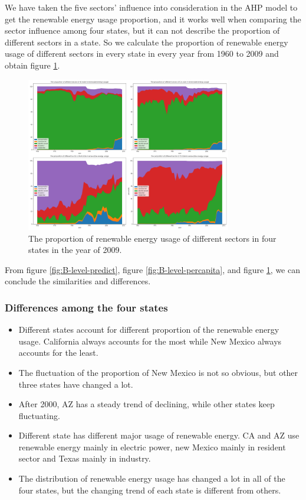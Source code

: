\documentclass[a4paper,11pt]{article}
\begin{document}
\par We have taken the five sectors' influence into consideration in the AHP model to get the renewable energy usage proportion, and it works well when comparing the sector influence among four states, but it can not describe the proportion of different sectors in a state. So we calculate the proportion of renewable energy usage of different sectors in every state in every year from 1960 to 2009 and obtain figure \ref{fig:B-percent}.
\begin{figure}[h]%
    \centering 
    \includegraphics[width=0.8\textwidth]{./Pic/B-percent.png}
    \caption{The proportion of renewable energy usage of different sectors in four states in the year of 2009.}
    \label{fig:B-percent}  
\end{figure}
\par From figure \ref{fig:B-level-predict}, figure \ref{fig:B-level-percapita}, and figure \ref{fig:B-percent}, we can conclude the similarities and differences.


\subsubsection{Differences among the four states}

\begin{itemize}
    \item Different states account for different proportion of the renewable energy usage. California always accounts for the most while New Mexico always accounts for the least.
    \item The fluctuation of the proportion of New Mexico is not so obvious, but other three states have changed a lot.
    \item After 2000, AZ has a steady trend of declining, while other states keep fluctuating.
    \item Different state has different major usage of renewable energy. CA and AZ use renewable energy mainly in electric power, new Mexico mainly in resident sector and Texas mainly in industry.
    \item The distribution of renewable energy usage has changed a lot in all of the four states, but the changing trend of each state is different from others.
\end{itemize}
\end{document}
